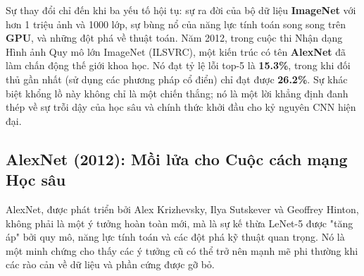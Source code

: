 Sự thay đổi chỉ đến khi ba yếu tố hội tụ: sự ra đời của bộ dữ liệu \textbf{ImageNet} \cite{Russakovsky2015} với hơn 1 triệu ảnh và 1000 lớp, sự bùng nổ của năng lực tính toán song song trên \textbf{GPU}, và những đột phá về thuật toán. Năm 2012, trong cuộc thi Nhận dạng Hình ảnh Quy mô lớn ImageNet (ILSVRC), một kiến trúc có tên \textbf{AlexNet} \cite{Krizhevsky2012} đã làm chấn động thế giới khoa học. Nó đạt tỷ lệ lỗi top-5 là \textbf{15.3\%}, trong khi đối thủ gần nhất (sử dụng các phương pháp cổ điển) chỉ đạt được \textbf{26.2\%}. Sự khác biệt khổng lồ này không chỉ là một chiến thắng; nó là một lời khẳng định đanh thép về sự trỗi dậy của học sâu và chính thức khởi đầu cho kỷ nguyên CNN hiện đại.

\subsection{AlexNet (2012): Mồi lửa cho Cuộc cách mạng Học sâu}
\label{subsec:alexnet}

AlexNet, được phát triển bởi Alex Krizhevsky, Ilya Sutskever và Geoffrey Hinton, không phải là một ý tưởng hoàn toàn mới, mà là sự kế thừa LeNet-5 được "tăng áp" bởi quy mô, năng lực tính toán và các đột phá kỹ thuật quan trọng. Nó là một minh chứng cho thấy các ý tưởng cũ có thể trở nên mạnh mẽ phi thường khi các rào cản về dữ liệu và phần cứng được gỡ bỏ.

